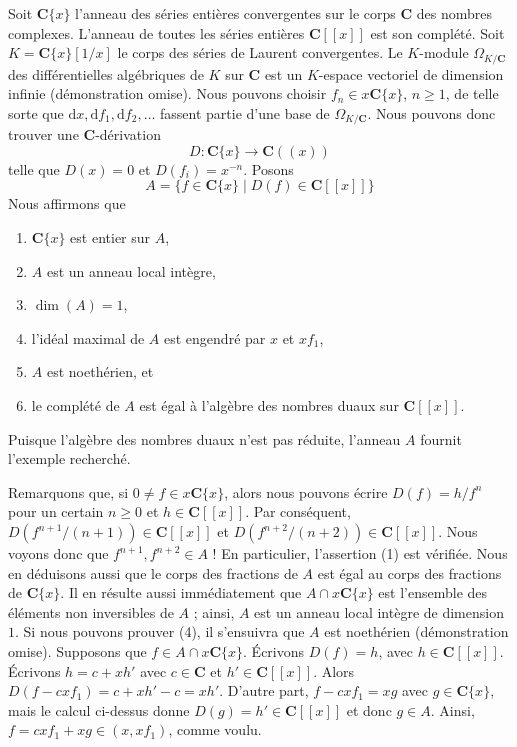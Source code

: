 \medskip\noindent
Soit $\mathbf{C}\{x\}$ l'anneau des séries entières convergentes sur
le corps $\mathbf{C}$ des nombres complexes. L'anneau de toutes les séries entières
$\mathbf{C}[[x]]$ est son complété. Soit $K = \mathbf{C}\{x\}[1/x]$
le corps des séries de Laurent convergentes. Le $K$-module
$\Omega_{K/\mathbf{C}}$ des différentielles algébriques
de $K$ sur $\mathbf{C}$ est un $K$-espace vectoriel de dimension infinie
(démonstration omise). Nous pouvons choisir $f_n \in x\mathbf{C}\{x\}$,
$n \geq 1$, de telle sorte que
$
\text{d}x, \text{d}f_1, \text{d}f_2, \ldots
$
fassent partie d'une base de $\Omega_{K/\mathbf{C}}$. Nous pouvons donc
trouver une $\mathbf{C}$-dérivation
$$
D : \mathbf{C}\{x\} \longrightarrow \mathbf{C}((x))
$$
telle que $D(x) = 0$ et $D(f_i) = x^{-n}$. Posons
$$
A = \{f \in \mathbf{C}\{x\} \mid D(f) \in \mathbf{C}[[x]]\}
$$
Nous affirmons que
\begin{enumerate}
\item $\mathbf{C}\{x\}$ est entier sur $A$,
\item $A$ est un anneau local intègre,
\item $\dim(A) = 1$,
\item l'idéal maximal de $A$ est engendré par $x$ et $xf_1$,
\item $A$ est noethérien, et
\item le complété de $A$ est égal à l'algèbre des nombres duaux
sur $\mathbf{C}[[x]]$.
\end{enumerate}
Puisque l'algèbre des nombres duaux n'est pas réduite, l'anneau $A$ fournit l'exemple recherché.

\medskip\noindent
Remarquons que, si $0 \not = f \in x\mathbf{C}\{x\}$, alors
nous pouvons écrire $D(f) = h/f^n$ pour un certain $n \geq 0$ et $h \in \mathbf{C}[[x]]$.
Par conséquent, $D(f^{n + 1}/(n + 1)) \in \mathbf{C}[[x]]$
et $D(f^{n + 2}/(n + 2)) \in \mathbf{C}[[x]]$. Nous voyons donc que
$f^{n + 1}, f^{n + 2} \in A$ !
En particulier, l'assertion (1) est vérifiée. Nous en déduisons aussi que
le corps des fractions de $A$ est égal au corps des fractions de
$\mathbf{C}\{x\}$. Il en résulte aussi immédiatement que
$A \cap x\mathbf{C}\{x\}$ est l'ensemble des éléments non inversibles de $A$ ; ainsi,
$A$ est un anneau local intègre de dimension $1$. Si nous pouvons prouver (4),
il s'ensuivra que $A$ est noethérien (démonstration omise).
Supposons que $f \in A \cap x\mathbf{C}\{x\}$. Écrivons
$D(f) = h$, avec $h \in \mathbf{C}[[x]]$. Écrivons $h = c + xh'$
avec $c \in \mathbf{C}$ et $h' \in \mathbf{C}[[x]]$. Alors
$D(f - cxf_1) = c + xh' - c = xh'$. D'autre part,
$f - cxf_1 = xg$ avec $g \in \mathbf{C}\{x\}$, mais le
calcul ci-dessus donne $D(g) = h' \in \mathbf{C}[[x]]$
et donc $g \in A$. Ainsi, $f = cxf_1 + xg \in (x, xf_1)$, comme voulu.

